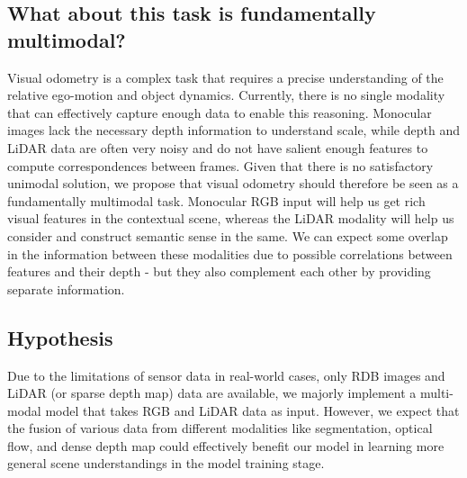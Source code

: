 \documentclass[11pt,a4paper]{article}
\begin{document}
\subsection{What about this task is fundamentally multimodal?}
Visual odometry is a complex task that requires a precise understanding of the relative ego-motion and object dynamics. Currently, there is no single modality that can effectively capture enough data to enable this reasoning. Monocular images lack the necessary depth information to understand scale, while depth and LiDAR data are often very noisy and do not have salient enough features to compute correspondences between frames. Given that there is no satisfactory unimodal solution, we propose that visual odometry should therefore be seen as a fundamentally multimodal task. Monocular RGB input will help us get rich visual features in the contextual scene, whereas the LiDAR modality will help us consider and construct semantic sense in the same. We can expect some overlap in the information between these modalities due to possible correlations between features and their depth - but they also complement each other by providing separate information.

\subsection{Hypothesis}
Due to the limitations of sensor data in real-world cases, only RDB images and LiDAR (or sparse depth map) data are available, we majorly implement a multi-modal model that takes RGB and LiDAR data as input. However, we expect that the fusion of various data from different modalities like segmentation, optical flow, and dense depth map could effectively benefit our model in learning more general scene understandings in the model training stage.
\end{document}
